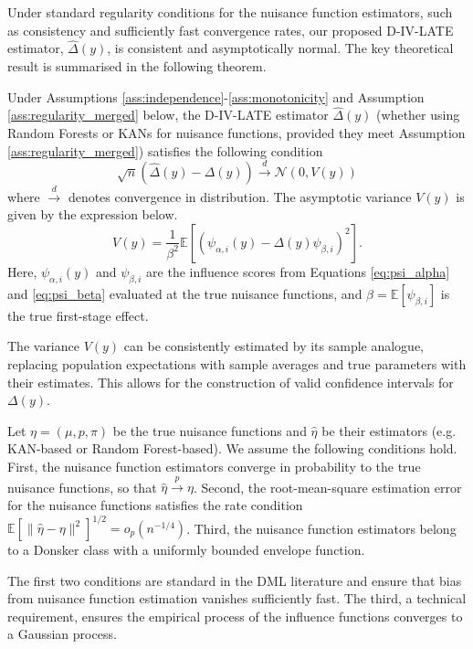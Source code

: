 \documentclass[final,3p,fleqn, 10pt]{elsarticle}
\begin{document}
Under standard regularity conditions for the nuisance function estimators, such as consistency and sufficiently fast convergence rates, our proposed D-IV-LATE estimator, $\hat{\Delta}(y)$, is consistent and asymptotically normal. The key theoretical result is summarised in the following theorem.

\begin{theorem}
\label{thm:asymptotic_normality}
Under Assumptions \ref{ass:independence}-\ref{ass:monotonicity} and Assumption \ref{ass:regularity_merged} below, the D-IV-LATE estimator $\hat{\Delta}(y)$ (whether using Random Forests or KANs for nuisance functions, provided they meet Assumption \ref{ass:regularity_merged}) satisfies the following condition
$$ \sqrt{n} (\hat{\Delta}(y) - \Delta(y)) \xrightarrow{d} \mathcal{N}(0, V(y)) $$
where $\xrightarrow{d}$ denotes convergence in distribution. The asymptotic variance $V(y)$ is given by the expression below.
$$ V(y) = \frac{1}{\beta^2} \mathbb{E}[(\psi_{\alpha, i}(y) - \Delta(y)\psi_{\beta, i})^2]. $$
Here, $\psi_{\alpha, i}(y)$ and $\psi_{\beta, i}$ are the influence scores from Equations \ref{eq:psi_alpha} and \ref{eq:psi_beta} evaluated at the true nuisance functions, and $\beta = \mathbb{E}[\psi_{\beta, i}]$ is the true first-stage effect.
\end{theorem}

The variance $V(y)$ can be consistently estimated by its sample analogue, replacing population expectations with sample averages and true parameters with their estimates. This allows for the construction of valid confidence intervals for $\Delta(y)$.

\begin{assumption}
\label{ass:regularity_merged}
Let $\eta = (\mu, p, \pi)$ be the true nuisance functions and $\hat{\eta}$ be their estimators (e.g. KAN-based or Random Forest-based). We assume the following conditions hold.
First, the nuisance function estimators converge in probability to the true nuisance functions, so that $\hat{\eta} \xrightarrow{p} \eta$.
Second, the root-mean-square estimation error for the nuisance functions satisfies the rate condition $\mathbb{E}[\|\hat{\eta} - \eta\|^2]^{1/2} = o_p(n^{-1/4})$.
Third, the nuisance function estimators belong to a Donsker class with a uniformly bounded envelope function.
\end{assumption}

The first two conditions are standard in the DML literature and ensure that bias from nuisance function estimation vanishes sufficiently fast. The third, a technical requirement, ensures the empirical process of the influence functions converges to a Gaussian process.
\end{document}
